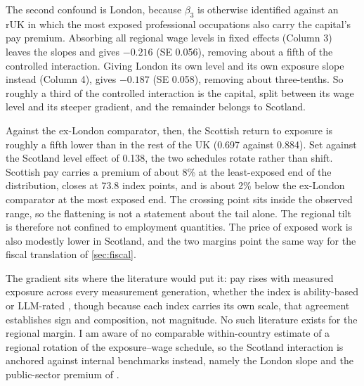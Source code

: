 The second confound is London, because $\beta_3$ is otherwise identified against an rUK in which the most exposed professional occupations also carry the capital's pay premium. Absorbing all regional wage levels in fixed effects (Column 3) leaves the slopes and gives $-0.216$ (SE 0.056), removing about a fifth of the controlled interaction. Giving London its own level and its own exposure slope instead (Column 4), gives $-0.187$ (SE 0.058), removing about three-tenths. So roughly a third of the controlled interaction is the capital, split between its wage level and its steeper gradient, and the remainder belongs to Scotland.

Against the ex-London comparator, then, the Scottish return to exposure is roughly a fifth lower than in the rest of the UK (0.697 against 0.884). Set against the Scotland level effect of 0.138, the two schedules rotate rather than shift. Scottish pay carries a premium of about 8\% at the least-exposed end of the distribution, closes at 73.8 index points, and is about 2\% below the ex-London comparator at the most exposed end. The crossing point sits inside the observed range, so the flattening is not a statement about the tail alone. The regional tilt is therefore not confined to employment quantities. The price of exposed work is also modestly lower in Scotland, and the two margins point the same way for the fiscal translation of \cref{sec:fiscal}.

The gradient sits where the literature would put it: pay rises with measured exposure across every measurement generation, whether the index is ability-based or LLM-rated \citep{felten2021, eloundou2024, henseke2025, pizzinelli2023}, though because each index carries its own scale, that agreement establishes sign and composition, not magnitude. No such literature exists for the regional margin. I am aware of no comparable within-country estimate of a regional rotation of the exposure--wage schedule, so the Scotland interaction is anchored against internal benchmarks instead, namely the London slope and the public-sector premium of \citet{cribb2025}.

\begin{table}[t]
\centering
\caption{Exposure--wage gradient: sample, controls, and the London confound}
\label{tab:wagespecs}

\end{table}

